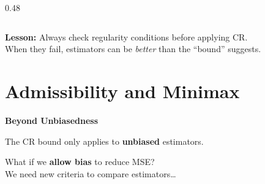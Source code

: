 \documentclass[aspectratio=169]{beamer}
\begin{document}
\begin{frame}
\begin{columns}[T]
\begin{column}{0.48\textwidth}
\begin{center}
\end{center}
\end{column}
\end{columns}

\vspace{0.15cm}
\centering\small\textbf{Lesson:} Always check regularity conditions before applying CR.\\
When they fail, estimators can be \emph{better} than the ``bound'' suggests.
\end{frame}

\section{Admissibility and Minimax}

\begin{frame}
\begin{center}
\vspace{1cm}
{\LARGE\bfseries\textcolor{popblue}{Beyond Unbiasedness}}

\vspace{0.6cm}
{\large The CR bound only applies to \textbf{unbiased} estimators.}

\vspace{0.4cm}
{\large What if we \textbf{allow bias} to reduce MSE?\\[4pt]
We need new criteria to compare estimators\ldots}
\end{center}
\end{frame}
\end{document}
